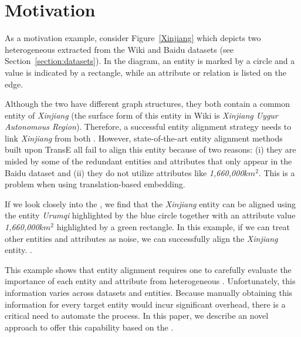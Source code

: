 \section{Motivation}
As a motivation example, consider Figure~\ref{Xinjiang} which depicts two heterogeneous \KGs extracted from the Wiki and Baidu datasets
(see Section~\ref{section:datasets}). In the diagram, an entity is marked by a circle and a value is indicated by a rectangle, while an
attribute or relation is listed on the edge.

Although the two \KGs have different graph structures, they both contain a common entity of \emph{Xinjiang} (the surface form of this
entity in Wiki is \emph{Xinjiang Uygur Autonomous Region}). Therefore, a successful entity alignment strategy needs to link \emph{Xinjiang}
from both \KGs. However, state-of-the-art entity alignment methods~\cite{hao2016joint,chen2016multilingual,sun2017cross,zhu2017iterative}
built upon TransE all fail to align this entity because of two reasons: (i) they are misled by some of the redundant entities and
attributes that only appear in the Baidu dataset and (ii) they do not utilize attributes like \emph{1,660,000$km^2$}. This is a problem
when using translation-based embedding.

If we look closely into the \KGs, we find that the \emph{Xinjiang} entity can be aligned using the entity \emph{Urumqi} highlighted by the
blue circle together with an attribute value \emph{1,660,000$km^2$} highlighted by a green rectangle. In this example, if we can treat
other entities and attributes as noise, we can successfully align the \emph{Xinjiang} entity. . 

This example shows that entity alignment requires one to carefully evaluate the importance of each entity and attribute from heterogeneous
\KGs. Unfortunately, this information varies across datasets and entities. Because manually obtaining this information for every target
entity would incur significant overhead, there is a critical need to automate the process. In this paper, we describe an novel approach to
offer this capability based on the \RGCN.
